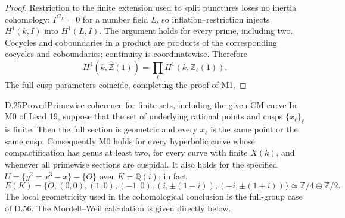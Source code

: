 \begin{proof}
Restriction to the finite extension
used to split punctures loses no inertia
cohomology: \(I^{G_L}=0\) for a number
field \(L\), so inflation--restriction
injects \(H^1(k,I)\) into \(H^1(L,I)\).
The argument holds for every prime,
including two. Cocycles and coboundaries
in a product are products of the
corresponding cocycles and coboundaries;
continuity is coordinatewise. Therefore
\[
 H^1(k,\widehat{\mathbb Z}(1))
         =\prod_\ell H^1(k,\mathbb Z_\ell(1)).
\]
The full cusp parameters coincide,
completing the proof of M1.
\end{proof}

\begin{statement}{D.25}{Proved}{Primewise coherence for finite sets, including the given CM curve}
In M0 of Lead 19, suppose that the set of
underlying rational points and cusps
\(\{x_\ell\}_\ell\) is finite. Then the full
section is geometric and every \(x_\ell\)
is the same point or the same cusp.
Consequently M0 holds for every hyperbolic
curve whose compactification has genus at
least two, for every curve with finite
\(X(k)\), and whenever all primewise
sections are cuspidal. It also holds for
the specified \(U=\{y^2=x^3-x\}-\{O\}\)
over \(K=\mathbb Q(i)\); in fact
\[
 E(K)=\{O,(0,0),(1,0),(-1,0),
          (i,\pm(1-i)),(-i,\pm(1+i))\}
       \simeq\mathbb Z/4\oplus\mathbb Z/2.        \tag{D.25.1}
\]
The local geometricity used in the cohomological
conclusion is the full-group case of D.56.
The Mordell--Weil calculation is given directly below.
\end{statement}
